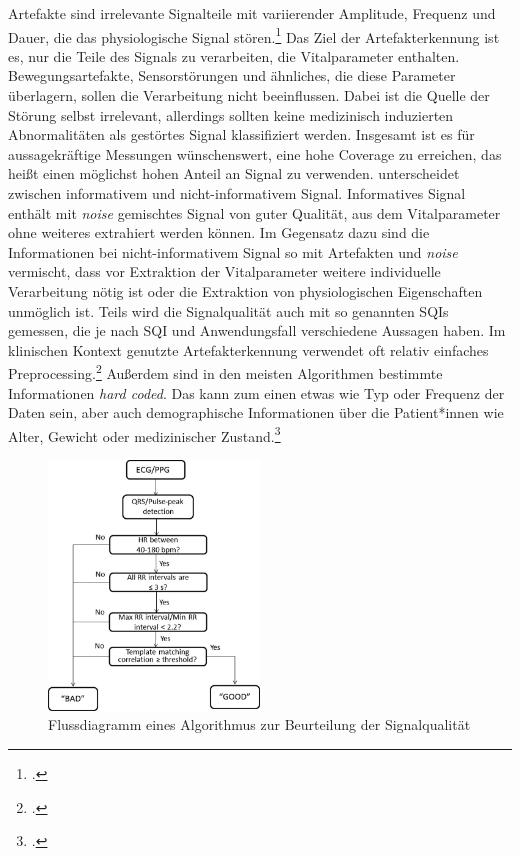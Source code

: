 	Artefakte sind irrelevante Signalteile mit variierender Amplitude, Frequenz und Dauer, die das physiologische Signal stören.\footcite{Nizami2013} Das Ziel der Artefakterkennung ist es, nur die Teile des Signals zu verarbeiten, die Vitalparameter enthalten. Bewegungsartefakte, Sensorstörungen und ähnliches, die diese Parameter überlagern, sollen die Verarbeitung nicht beeinflussen. Dabei ist die Quelle der Störung selbst irrelevant, allerdings sollten keine medizinisch induzierten Abnormalitäten als gestörtes Signal klassifiziert werden. Insgesamt ist es für aussagekräftige Messungen wünschenswert, eine hohe Coverage zu erreichen, das heißt einen möglichst hohen Anteil an Signal zu verwenden. \citeauthor{Sadek2016} unterscheidet zwischen informativem und nicht-informativem Signal. Informatives Signal enthält mit \textit{noise} gemischtes Signal von guter Qualität, aus dem Vitalparameter ohne weiteres extrahiert werden können. Im Gegensatz dazu sind die Informationen bei nicht-informativem Signal so mit Artefakten und \textit{noise} vermischt, dass vor Extraktion der Vitalparameter weitere individuelle Verarbeitung nötig ist oder die Extraktion von physiologischen Eigenschaften unmöglich ist. Teils wird die Signalqualität auch mit so genannten \acp{SQI} gemessen, die je nach \ac{SQI} und Anwendungsfall verschiedene Aussagen haben. Im klinischen Kontext genutzte Artefakterkennung verwendet oft relativ einfaches Preprocessing.\footcite{Nizami2013} Außerdem sind in den meisten Algorithmen bestimmte Informationen \textit{hard coded}. Das kann zum einen etwas wie Typ oder Frequenz der Daten sein, aber auch demographische Informationen über die Patient*innen wie Alter, Gewicht oder medizinischer Zustand.\footcite{Nizami2013}
		
	\begin{figure}[H]
		\centering
		\includegraphics[width=0.5\textwidth]{pic/ad_flussdiagramm}
		\caption[Flussdiagramm eines Algorithmus zur Beurteilung der Signalqualität]{Flussdiagramm eines Algorithmus zur Beurteilung der Signalqualität\protect\footnotemark}
		\label{fig:ecg-ad}
	\end{figure}
	
